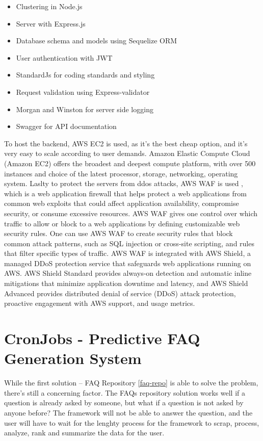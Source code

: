 \begin{itemize}
  \item {Clustering in Node.js}
  \item {Server with Express.js}
  \item {Database schema and models using Sequelize ORM}
  \item {User authentication with JWT}
  \item {StandardJs for coding standards and styling}
  \item {Request validation using Express-validator}
  \item {Morgan and Winston for server side logging}
  \item {Swagger for API documentation}
\end{itemize}

To host the backend, AWS EC2 is used, as it's the best cheap option, and it's very easy to scale according to user demands. Amazon Elastic Compute Cloud (Amazon EC2) offers the broadest and deepest compute platform, with over 500 instances and choice of the latest processor, storage, networking, operating system. Laslty to protect the servers from ddos attacks, AWS WAF is used , which is a web application firewall that helps protect a web applications from common web exploits that could affect application availability, compromise security, or consume excessive resources. AWS WAF gives one control over which traffic to allow or block to a web applications by defining customizable web security rules. One can use AWS WAF to create security rules that block common attack patterns, such as SQL injection or cross-site scripting, and rules that filter specific types of traffic. AWS WAF is integrated with AWS Shield, a managed DDoS protection service that safeguards web applications running on AWS. AWS Shield Standard provides always-on detection and automatic inline mitigations that minimize application downtime and latency, and AWS Shield Advanced provides distributed denial of service (DDoS) attack protection, proactive engagement with AWS support, and usage metrics.

\section{CronJobs - Predictive FAQ Generation System}
While the first solution -- FAQ Repository \ref*{faq-repo} is able to solve the problem, there's still a concerning factor. The FAQs repository solution works well if a question is already asked by someone, but what if a question is not asked by anyone before? The framework will not be able to answer the question, and the user will have to wait for the lenghty process for the framework to scrap, process, analyze, rank and summarize the data for the user.

